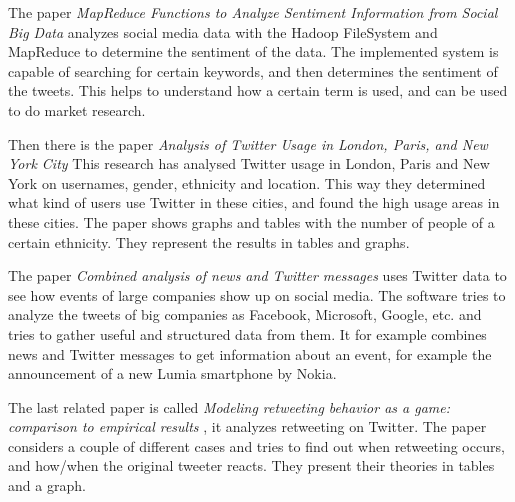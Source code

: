 The paper \emph{MapReduce Functions to Analyze Sentiment Information from Social Big Data} \cite{haMapReduceFunctionsToAnalyzeSentiment} analyzes social media data with the Hadoop FileSystem and MapReduce to determine the sentiment of the data. The implemented system is capable of searching for certain keywords, and then determines the sentiment of the tweets. This helps to understand how a certain term is used, and can be used to do market research. 

Then there is the paper \emph{Analysis of Twitter Usage in London, Paris, and New York City} \cite{adnanAnalysisOfTwitterUsageInLondon} This research has analysed Twitter usage in London, Paris and New York on usernames, gender, ethnicity and location. This way they determined what kind of users use Twitter in these cities, and found the high usage areas in these cities. The paper shows graphs and tables with the number of people of a certain ethnicity. They represent the results in tables and graphs.

The paper \emph{Combined analysis of news and Twitter messages} \cite{duCombinedAnalysisOfNewsAndTwitterMessages} uses Twitter data to see how events of large companies show up on social media. The software tries to analyze the tweets of big companies as Facebook, Microsoft, Google, etc. and tries to gather useful and structured data from them. It for example combines news and Twitter messages to get information about an event, for example the announcement of a new Lumia smartphone by Nokia.

The last related paper is called \emph{Modeling retweeting behavior as a game: comparison to empirical results} \cite{learyModelingRetweetingBehaviorAsAGame}, it analyzes retweeting on Twitter. The paper considers a couple of different cases and tries to find out when retweeting occurs, and how/when the original tweeter reacts. They present their theories in tables and a graph.